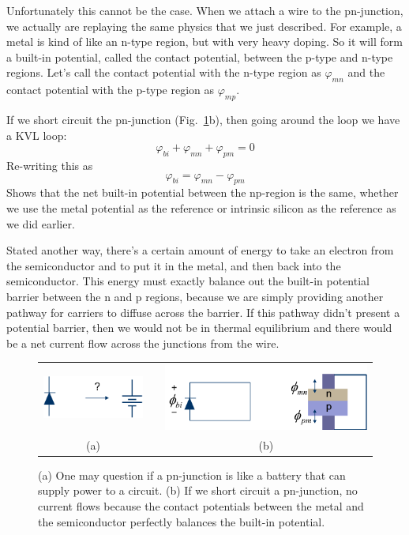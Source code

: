 Unfortunately this cannot be the case.  When we attach a wire to the pn-junction, we actually are replaying the same physics that we just described.  For example, a metal is kind of like an n-type region, but with very heavy doping.  So it will form a built-in potential, called the contact potential, between the p-type and n-type regions.  Let's call the contact potential with the n-type region as $\varphi_{mn}$ and the contact potential with the p-type region as $\varphi_{mp}$.  

If we short circuit the pn-junction (Fig.~\ref{fig:slide25}b), then going around the loop we have a KVL loop:
\begin{equation}
	\varphi_{bi} + \varphi_{mn} + \varphi_{pm} = 0
\end{equation}
Re-writing this as 
\begin{equation}
	\varphi_{bi} =  \varphi_{mn} - \varphi_{pm} 
\end{equation}
Shows that the net built-in potential between the np-region is the same, whether we use the metal potential as the reference or intrinsic silicon as the reference as we did earlier.  

Stated another way, there's a certain amount of energy to take an electron from the semiconductor and to put it in the metal, and then back into the semiconductor.  This energy must exactly balance out the built-in potential barrier between the n and p regions, because we are simply providing another pathway for carriers to diffuse across the barrier.  If this pathway didn't present a potential barrier,  then we would not be in thermal equilibrium and there would be a net current flow across the junctions from the wire.
\begin{figure}[tb]
\begin{center}
\begin{tabular}{ccc}
\includegraphics[width=.3\columnwidth]{slide25} & \hspace{.5cm} &
\includegraphics[width=.45\columnwidth]{slide26}\\
(a) &  & (b) \\
\end{tabular}
\end{center}
\caption{(a) One may question if a pn-junction is like a battery that can supply power to a circuit.  (b) If we short circuit a pn-junction, no current flows because the contact potentials between the metal and the semiconductor perfectly balances the built-in potential. }
\label{fig:slide25}
\end{figure}
